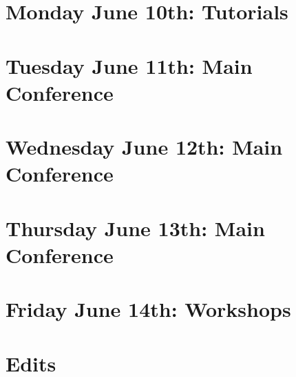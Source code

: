 \documentclass[11pt]{article}
\begin{document}
\newpage
\section{Monday June 10th: Tutorials}




\newpage
\section{Tuesday June 11th: Main Conference}




\newpage
\section{Wednesday June 12th: Main Conference}




\newpage
\section{Thursday June 13th: Main Conference}




\newpage
\section{Friday June 14th: Workshops}




\section*{Edits}




\newpage


\end{document}
